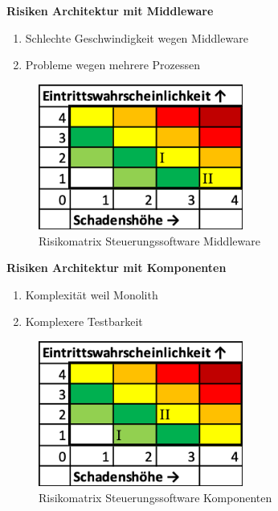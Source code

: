 \documentclass[../../../main.tex]{subfiles}
\begin{document}
\textbf{Risiken Architektur mit Middleware}
    \begin{enumerate}[I]
        \item Schlechte Geschwindigkeit wegen Middleware
        \item Probleme wegen mehrere Prozessen
    \end{enumerate}

    \begin{figure}[H]
        \centering
        \includegraphics[width=0.6\textwidth]{images/Steuerungssoftware/Risiko_Steuerungssoftware_Middleware.png}
        \caption {Risikomatrix Steuerungssoftware Middleware}
    \end{figure}

\textbf{Risiken Architektur mit Komponenten}
    \begin{enumerate}[I]
        \item Komplexität weil Monolith
        \item Komplexere Testbarkeit
    \end{enumerate}

    \begin{figure}[H]
        \centering
        \includegraphics[width=0.6\textwidth]{images/Steuerungssoftware/Risiko_Steuerungssoftware_Komponenten.png}
        \caption {Risikomatrix Steuerungssoftware Komponenten}
    \end{figure}
\end{document}
